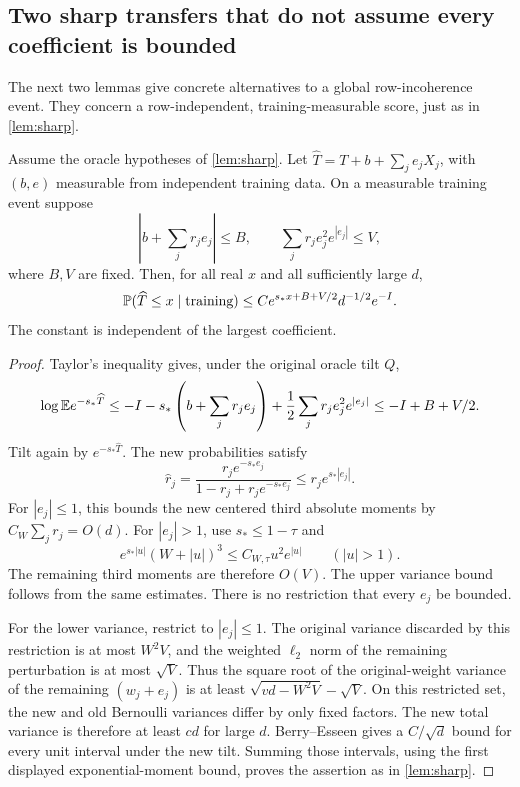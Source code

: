 \subsection{Two sharp transfers that do not assume every coefficient is bounded}

The next two lemmas give concrete alternatives to a global
row-incoherence event. They concern a row-independent, training-measurable
score, just as in \cref{lem:sharp}.

\begin{lemma}\label{lem:sparse-exp-transfer}
Assume the oracle hypotheses of \cref{lem:sharp}. Let
$\widehat T=T+b+\sum_je_jX_j$, with $(b,e)$ measurable from independent
training data. On a measurable training event suppose
\[
 \left|b+\sum_jr_je_j\right|\le B,\qquad
 \sum_jr_je_j^2e^{|e_j|}\le V,
\]
where $B,V$ are fixed. Then, for all real $x$ and all sufficiently
large $d$,
\[
 \mathbb P(\widehat T\le x\mid\text{training})
 \le C e^{s_*x+B+V/2}d^{-1/2}e^{-I}.
\]
The constant is independent of the largest coefficient.
\end{lemma}

\begin{proof}
Taylor's inequality gives, under the original oracle tilt $Q$,
\[
 \log\mathbb E e^{-s_*\widehat T}
 \le-I-s_*\left(b+\sum_jr_je_j\right)
       +\frac12\sum_jr_je_j^2e^{|e_j|}
 \le-I+B+V/2.
\]
Tilt again by $e^{-s_*\widehat T}$. The new probabilities satisfy
\[
 \widehat r_j
 =\frac{r_je^{-s_*e_j}}{1-r_j+r_je^{-s_*e_j}}
 \le r_je^{s_*|e_j|}.
\]
For $|e_j|\le1$, this bounds the new centered third absolute moments
by $C_W\sum_jr_j=O(d)$. For $|e_j|>1$, use $s_*\le1-\tau$ and
\[
 e^{s_*|u|}(W+|u|)^3
 \le C_{W,\tau}u^2e^{|u|}\qquad (|u|>1).
\]
The remaining third moments are therefore $O(V)$. The upper variance
bound follows from the same estimates. There is no restriction that
every $e_j$ be bounded.

For the lower variance, restrict to $|e_j|\le1$. The original variance
discarded by this restriction is at most $W^2V$, and the weighted
$\ell_2$ norm of the remaining perturbation is at most $\sqrt V$.
Thus the square root of the original-weight variance of the remaining
$(w_j+e_j)$ is at least $\sqrt{vd-W^2V}-\sqrt V$.
On this restricted set, the new and old Bernoulli variances differ by
only fixed factors. The new total variance is therefore at least $cd$
for large $d$. Berry--Esseen gives a $C/\sqrt d$ bound for every unit
interval under the new tilt. Summing those intervals, using the first
displayed exponential-moment bound, proves the assertion as in
\cref{lem:sharp}.
\end{proof}

